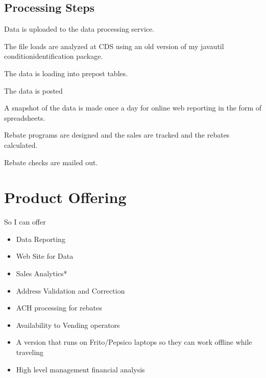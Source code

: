 \documentclass[letterpaper,10pt,english]{sphinxmanual}
\begin{document}
\subsection{Processing Steps}
\label{\detokenize{Contributions:processing-steps}}
Data is uploaded to the data processing service.

The file loads are analyzed at CDS using an old version of my javautil conditionidentification package.

The data is loading into prepost tables.

The data is posted

A snapshot of the data is made once a day for online web reporting in the form of spreadsheets.

Rebate programs are designed and the sales are tracked and the rebates calculated.

Rebate checks are mailed out.


\section{Product Offering}
\label{\detokenize{ProductOffering:product-offering}}\label{\detokenize{ProductOffering::doc}}
So I can offer
\begin{itemize}
\item {} 
Data Reporting

\item {} 
Web Site for Data

\item {} 
Sales Analytics*

\item {} 
Address Validation and Correction

\item {} 
ACH processing for rebates

\item {} 
Availability to Vending operators

\item {} 
A version that runs on Frito/Pepsico laptops so they can work offline while traveling

\item {} 
High level management financial analysis

\end{itemize}
\end{document}
